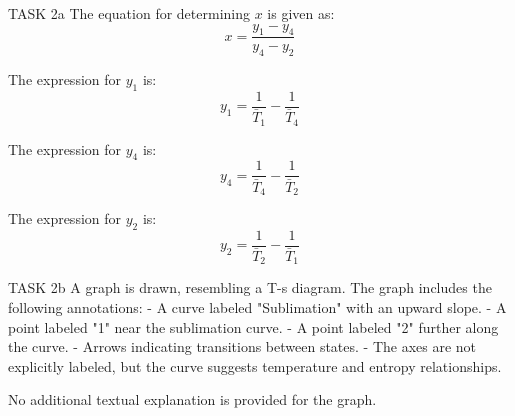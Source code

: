 TASK 2a  
The equation for determining \( x \) is given as:  
\[
x = \frac{y_1 - y_4}{y_4 - y_2}
\]  

The expression for \( y_1 \) is:  
\[
y_1 = \frac{1}{\bar{T}_1} - \frac{1}{\bar{T}_4}
\]  

The expression for \( y_4 \) is:  
\[
y_4 = \frac{1}{\bar{T}_4} - \frac{1}{\bar{T}_2}
\]  

The expression for \( y_2 \) is:  
\[
y_2 = \frac{1}{\bar{T}_2} - \frac{1}{\bar{T}_1}
\]  

TASK 2b  
A graph is drawn, resembling a T-s diagram. The graph includes the following annotations:  
- A curve labeled "Sublimation" with an upward slope.  
- A point labeled "1" near the sublimation curve.  
- A point labeled "2" further along the curve.  
- Arrows indicating transitions between states.  
- The axes are not explicitly labeled, but the curve suggests temperature and entropy relationships.  

No additional textual explanation is provided for the graph.